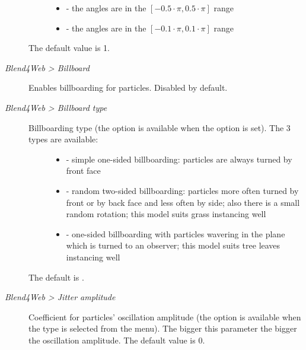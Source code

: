 \documentclass[a4paper,12pt,oneside]{sphinxmanual}
\begin{document}
\begin{description}
\begin{description}
\begin{itemize}
\item {} 
 - the angles are in the \([-0.5 \cdot \pi, 0.5 \cdot \pi]\) range

\item {} 
 - the angles are in the \([-0.1 \cdot \pi, 0.1 \cdot \pi]\) range

\end{itemize}

\end{description}

The default value is 1.

\item[{\emph{Blend4Web \textgreater{} Billboard}}] \leavevmode
Enables billboarding for particles. Disabled by default.

\item[{\emph{Blend4Web \textgreater{} Billboard type}}] \leavevmode\begin{description}
\item[{Billboarding type (the option is available when the  option is set). The 3 types are available:}] \leavevmode\begin{itemize}
\item {} 
 - simple one-sided billboarding: particles are always turned by front face

\item {} 
 - random two-sided billboarding: particles more often turned by front or by back face and less often by side; also there is a small random rotation; this model suits grass instancing well

\item {} 
 - one-sided billboarding with particles wavering in the plane which is turned to an observer; this model suits tree leaves instancing well

\end{itemize}

\end{description}

The default is .

\item[{\emph{Blend4Web \textgreater{} Jitter amplitude}}] \leavevmode
Coefficient for particles' oscillation amplitude (the option is available when the  type is selected from the  menu). The bigger this parameter the bigger the oscillation amplitude. The default value is 0.


\end{description}
\end{document}
